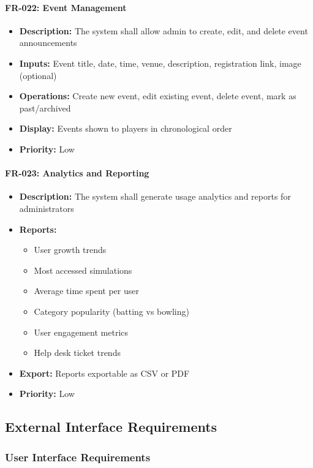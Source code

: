 \documentclass[12pt,a4paper]{article}
\begin{document}
\begin{enumerate}
\paragraph{FR-022: Event Management}
\begin{itemize}
    \item \textbf{Description:} The system shall allow admin to create, edit, and delete event announcements
    \item \textbf{Inputs:} Event title, date, time, venue, description, registration link, image (optional)
    \item \textbf{Operations:} Create new event, edit existing event, delete event, mark as past/archived
    \item \textbf{Display:} Events shown to players in chronological order
    \item \textbf{Priority:} Low
\end{itemize}

\paragraph{FR-023: Analytics and Reporting}
\begin{itemize}
    \item \textbf{Description:} The system shall generate usage analytics and reports for administrators
    \item \textbf{Reports:}
    \begin{itemize}
        \item User growth trends
        \item Most accessed simulations
        \item Average time spent per user
        \item Category popularity (batting vs bowling)
        \item User engagement metrics
        \item Help desk ticket trends
    \end{itemize}
    \item \textbf{Export:} Reports exportable as CSV or PDF
    \item \textbf{Priority:} Low
\end{itemize}

\subsection{External Interface Requirements}

\subsubsection{User Interface Requirements}


\end{enumerate}
\end{document}
